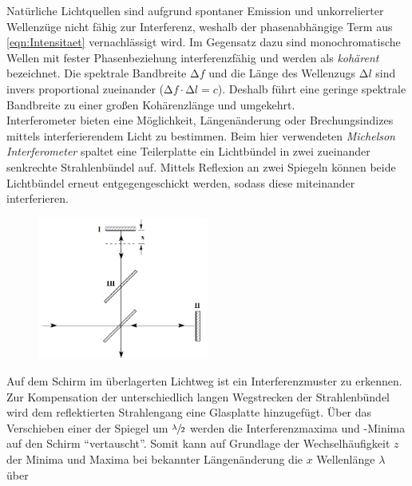 \noindent Natürliche Lichtquellen sind aufgrund spontaner Emission und unkorrelierter Wellenzüge nicht fähig zur Interferenz, weshalb der 
phasenabhängige Term aus \eqref{eqn:Intensitaet} vernachlässigt wird. Im Gegensatz dazu sind monochromatische Wellen mit fester 
Phasenbeziehung interferenzfähig und werden als \emph{kohärent} bezeichnet. Die spektrale Bandbreite $\increment{}f$ und die Länge des 
Wellenzugs $\increment{}l$ sind invers proportional zueinander ($\increment{}f\cdot\increment{}l = c$). Deshalb führt eine geringe 
spektrale Bandbreite zu einer großen Kohärenzlänge und umgekehrt.\\
    Interferometer bieten eine Möglichkeit, Längenänderung oder Brechungsindizes mittels interferierendem Licht zu bestimmen.
    Beim hier verwendeten \emph{Michelson Interferometer} spaltet eine Teilerplatte ein Lichtbündel in zwei zueinander senkrechte 
    Strahlenbündel auf. Mittels Reflexion an zwei Spiegeln können beide Lichtbündel erneut entgegengeschickt werden, sodass diese miteinander 
    interferieren.
%
%
\begin{figure}
    \vspace{-20pt}
    \begin{center}
        \includegraphics[width=0.5\textwidth]{Michelson_Interferom.png}
    \end{center}
\end{figure}

\noindent Auf dem Schirm im überlagerten Lichtweg ist ein Interferenzmuster zu erkennen. Zur Kompensation der unterschiedlich langen 
Wegstrecken der Strahlenbündel wird dem reflektierten Strahlengang eine Glasplatte hinzugefügt. Über das Verschieben einer der 
Spiegel um $\sfrac{\lambda}{2}$ werden die Interferenzmaxima und -Minima auf den Schirm \enquote{vertauscht}. Somit kann auf Grundlage 
der Wechselhäufigkeit $z$ der Minima und Maxima bei bekannter Längenänderung die $x$ Wellenlänge $\lambda$ über 


